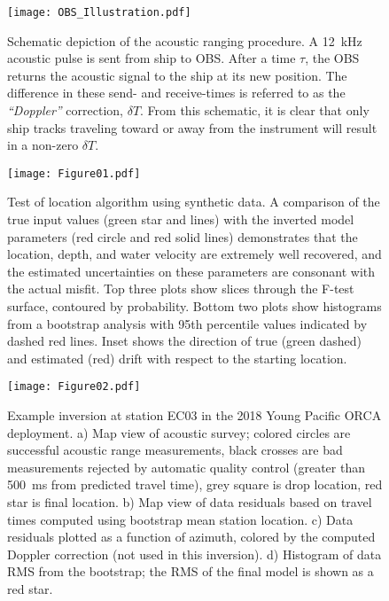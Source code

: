 \begin{figure}[h]
\texttt{[image: OBS\_Illustration.pdf]}
\caption{Schematic depiction of the acoustic ranging procedure. A 12~kHz acoustic pulse is sent from ship to OBS. After a time $\tau$, the OBS returns the acoustic signal to the ship at its new position. The difference in these send- and receive-times is referred to as the \textit{``Doppler''} correction, $\delta T$. From this schematic, it is clear that only ship tracks traveling toward or away from the instrument will result in a non-zero $\delta T$.}
\label{fig:cartoon}
\end{figure}

\begin{figure}[h]
\texttt{[image: Figure01.pdf]}
\caption{Test of location algorithm using synthetic data. A comparison of the true input values (green star and lines) with the inverted model parameters (red circle and red solid lines) demonstrates that the location, depth, and water velocity are extremely well recovered, and the estimated uncertainties on these parameters are consonant with the actual misfit. Top three plots show slices through the F-test surface, contoured by probability. Bottom two plots show histograms from a bootstrap analysis with 95th percentile values indicated by dashed red lines. Inset shows the direction of true (green dashed) and estimated (red) drift with respect to the starting location. }
\label{fig:one_sta_synth}
\end{figure}

\begin{figure}[h]
\texttt{[image: Figure02.pdf]}
\caption{Example inversion at station EC03 in the 2018 Young Pacific ORCA deployment. a) Map view of acoustic survey; colored circles are successful acoustic range measurements, black crosses are bad measurements rejected by automatic quality control (greater than 500~ms from predicted travel time), grey square is drop location, red star is final location. b) Map view of data residuals based on travel times computed using bootstrap mean station location. c) Data residuals plotted as a function of azimuth, colored by the computed Doppler correction (not used in this inversion). d) Histogram of data RMS from the bootstrap; the RMS of the final model is shown as a red star.}
\label{fig:one_sta_real_survey}
\end{figure}

